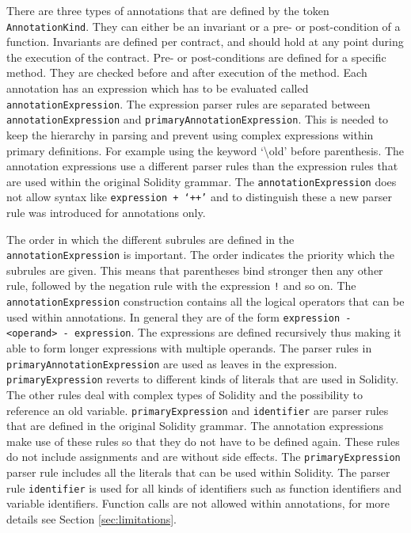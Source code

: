 \documentclass[a4paper]{article}
\begin{document}
There are three types of annotations that are defined by the token \texttt{AnnotationKind}. They can either be an invariant or a pre- or post-condition of a function. Invariants are defined per contract, and should hold at any point during the execution of the contract. Pre- or post-conditions are defined for a specific method. They are checked before and after execution of the method. Each annotation has an expression which has to be evaluated called \texttt{annotationExpression}. The expression parser rules are separated between \texttt{annotationExpression} and \texttt{primaryAnnotationExpression}. This is needed to keep the hierarchy in parsing and prevent using complex expressions within primary definitions. For example using the keyword `\textbackslash old' before parenthesis. The annotation expressions use a different parser rules than the expression rules that are used within the original Solidity grammar. The \texttt{annotationExpression} does not allow syntax like \texttt{expression + `++'} and to distinguish these a new parser rule was introduced for annotations only. \par
The order in which the different subrules are defined in the \texttt{annotationExpression} is important. The order indicates the priority which the subrules are given. This means that parentheses bind stronger then any other rule, followed by the negation rule with the expression \texttt{!} and so on. The \texttt{annotationExpression} construction contains all the logical operators that can be used within annotations. In general they are of the form \texttt{expression - <operand> - expression}. The expressions are defined recursively thus making it able to form longer expressions with multiple operands. The parser rules in \texttt{primaryAnnotationExpression} are used as leaves in the expression. \texttt{primaryExpression} reverts to different kinds of literals that are used in Solidity. The other rules deal with complex types of Solidity and the possibility to reference an old variable.  
\texttt{primaryExpression} and \texttt{identifier} are parser rules that are defined in the original Solidity grammar. The annotation expressions make use of these rules so that they do not have to be defined again. These rules do not include assignments and are without side effects. The \texttt{primaryExpression} parser rule includes all the literals that can be used within Solidity. The parser rule \texttt{identifier} is used for all kinds of identifiers such as function identifiers and variable identifiers. Function calls are not allowed within annotations, for more details see Section \ref{sec:limitations}.
\end{document}
